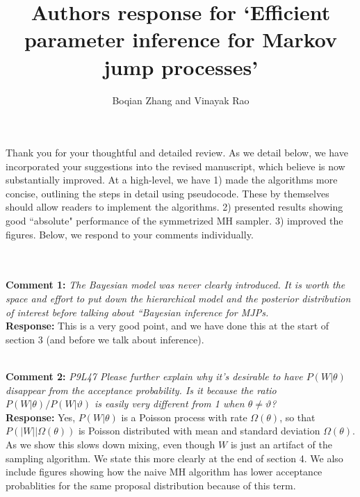 \documentclass[11pt]{article}
\title{Authors response for `Efficient parameter inference for Markov jump processes'}
\author{Boqian Zhang and Vinayak Rao }
\date{}
\newcommand{\rev}[2]{\textbf{Comment #1: }\emph{#2}}
\newcommand{\resp}{\textbf{Response: }}
\begin{document}
\maketitle

Thank you for your thoughtful and detailed review. As we detail below, we have incorporated your suggestions into the revised manuscript, which believe is now substantially improved. At a high-level, we have 1) made the algorithms more concise, outlining the steps in detail using pseudocode. These by themselves should allow readers to implement the algorithms. 2) presented results showing good ``absolute" performance of the symmetrized MH sampler. 3) improved the figures.
Below, we respond to your comments individually.

~\\~\\

\noindent \rev{1}{The Bayesian model was never clearly introduced. It is worth the space and effort to put down the hierarchical model and the posterior distribution of interest before talking about “Bayesian inference for MJPs.} \\
\resp This is a very good point, and we have done this at the start of section 3 (and before we talk about inference).

~\\
\rev{2}{P9L47 Please further explain why it’s desirable to have $P(W|\theta)$ disappear from the acceptance probability. Is it because the ratio 
$P(W|\theta)/P(W |\vartheta)$ is easily very different from 1 when $\theta \neq \vartheta$?} \\
\resp Yes, $P(W|\theta)$ is a Poisson process with rate $\Omega(\theta)$, so that $P(|W||\Omega(\theta))$ is Poisson distributed with mean and standard deviation $\Omega(\theta)$. 
As we show this slows down mixing, even though $W$ is just an artifact of the sampling algorithm.
We state this more clearly at the end of section 4. 
We also include figures showing how the naive MH algorithm has lower acceptance probablities for the same proposal distribution because of this term. 
\end{document}
